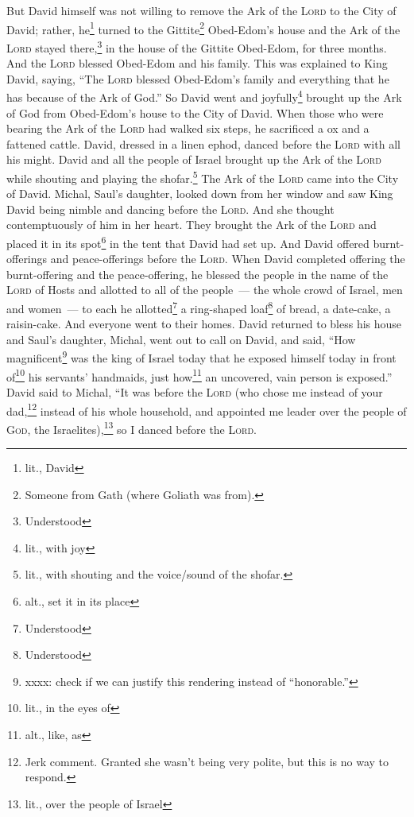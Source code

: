 \begin{inparaenum}
     But David himself was not willing to remove the Ark of the \textsc{Lord} to the City of David; rather, he\footnote{lit., David} turned to the Gittite\footnote{Someone from Gath (where Goliath was from).} Obed-Edom's house%
     and the Ark of the \textsc{Lord} stayed there,\footnote{Understood} in the house of the Gittite Obed-Edom, for three months. And the \textsc{Lord} blessed Obed-Edom and his family.%
     This was explained to King David, saying, ``The \textsc{Lord} blessed Obed-Edom's family and everything that he has because of the Ark of God.'' So David went and joyfully\footnote{lit., with joy} brought up the Ark of God from Obed-Edom's house to the City of David.%
     When those who were bearing the Ark of the \textsc{Lord} had walked six steps, he sacrificed a ox and a fattened cattle.%
     David, dressed in a linen ephod, danced before the \textsc{Lord} with all his might.%
     David and all the people of Israel brought up the Ark of the \textsc{Lord} while shouting and playing the shofar.\footnote{lit., with shouting and the voice/sound of the shofar.}%
     The Ark of the \textsc{Lord} came into the City of David. Michal, Saul's daughter, looked down from her window and saw King David being nimble and dancing before the \textsc{Lord}. And she thought contemptuously of him in her heart.%
     They brought the Ark of the \textsc{Lord} and placed it in its spot\footnote{alt., set it in its place} in the tent that David had set up. And David offered burnt-offerings and peace-offerings before the \textsc{Lord}.%
     When David completed offering the burnt-offering and the peace-offering, he blessed the people in the name of the \textsc{Lord} of Hosts%
     and allotted to all of the people~--- the whole crowd of Israel, men and women~--- to each he allotted\footnote{Understood} a ring-shaped loaf\footnote{Understood} of bread, a date-cake, a raisin-cake. And everyone went to their homes.%
     David returned to bless his house and Saul's daughter, Michal, went out to call on David, and said, ``How magnificent\footnote{xxxx: check if we can justify this rendering instead of ``honorable.''} was the king of Israel today that he exposed himself today in front of\footnote{lit., in the eyes of} his servants' handmaids, just how\footnote{alt., like, as} an uncovered, vain person is exposed.''%
     David said to Michal, ``It was before the \textsc{Lord} (who chose me instead of your dad,\footnote{Jerk comment. Granted she wasn't being very polite, but this is no way to respond.} instead of his whole household, and appointed me leader over the people of \textsc{God}, the Israelites),\footnote{lit., over the people of Israel} so I danced before the \textsc{Lord}.%

\end{inparaenum}

